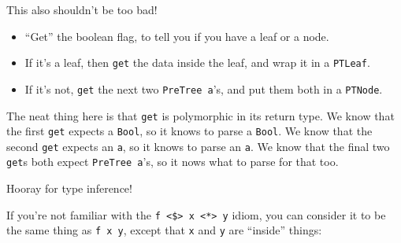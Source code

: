 \documentclass[]{article}
\newenvironment{Shaded}{}{}
\newcommand{\CommentTok}[1]{\textcolor[rgb]{0.38,0.63,0.69}{\textit{#1}}}
\newcommand{\DataTypeTok}[1]{\textcolor[rgb]{0.56,0.13,0.00}{#1}}
\newcommand{\DecValTok}[1]{\textcolor[rgb]{0.25,0.63,0.44}{#1}}
\newcommand{\FunctionTok}[1]{\textcolor[rgb]{0.02,0.16,0.49}{#1}}
\newcommand{\KeywordTok}[1]{\textcolor[rgb]{0.00,0.44,0.13}{\textbf{#1}}}
\newcommand{\NormalTok}[1]{#1}
\newcommand{\OtherTok}[1]{\textcolor[rgb]{0.00,0.44,0.13}{#1}}
\begin{document}
\begin{Shaded}
\end{Shaded}

This also shouldn't be too bad!

\begin{itemize}
\tightlist
\item
  ``Get'' the boolean flag, to tell you if you have a leaf or a node.
\item
  If it's a leaf, then \texttt{get} the data inside the leaf, and wrap it in a
  \texttt{PTLeaf}.
\item
  If it's not, \texttt{get} the next two \texttt{PreTree\ a}'s, and put them
  both in a \texttt{PTNode}.
\end{itemize}

The neat thing here is that \texttt{get} is polymorphic in its return type. We
know that the first \texttt{get} expects a \texttt{Bool}, so it knows to parse a
\texttt{Bool}. We know that the second \texttt{get} expects an \texttt{a}, so it
knows to parse an \texttt{a}. We know that the final two \texttt{get}s both
expect \texttt{PreTree\ a}'s, so it nows what to parse for that too.

Hooray for type inference!

If you're not familiar with the
\texttt{f\ \textless{}\$\textgreater{}\ x\ \textless{}*\textgreater{}\ y} idiom,
you can consider it to be the same thing as \texttt{f\ x\ y}, except that
\texttt{x} and \texttt{y} are ``inside'' things:

\begin{Shaded}
\end{Shaded}
\end{document}
